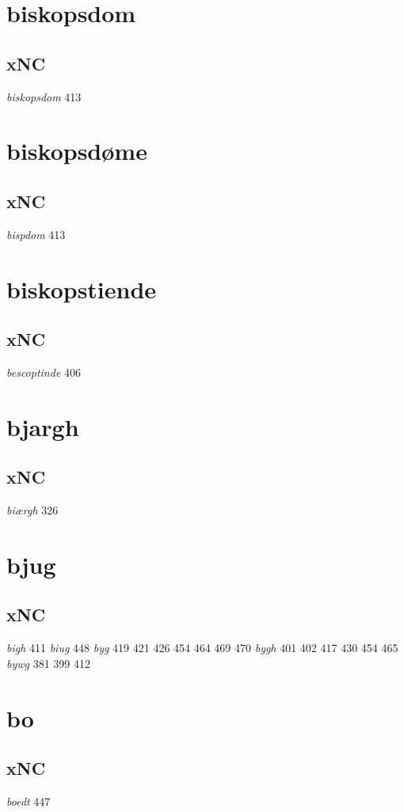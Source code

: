 \documentclass[a4paper,twocolumn]{article}
\begin{document}
\section{biskopsdom}
\label{sec:org0793478}
\subsection{xNC}
\label{sec:orgd5d79ae}
\emph{biskopsdom} 413 
\section{biskopsdøme}
\label{sec:org14a1450}
\subsection{xNC}
\label{sec:org1ad78c2}
\emph{bispdom} 413 
\section{biskopstiende}
\label{sec:orgf503265}
\subsection{xNC}
\label{sec:orgd4f937e}
\emph{bescoptinde} 406 
\section{bjargh}
\label{sec:orga0af52b}
\subsection{xNC}
\label{sec:org2cc499a}
\emph{biærgh} 326 
\section{bjug}
\label{sec:org2ef1be2}
\subsection{xNC}
\label{sec:orga3f7c33}
\emph{bigh} 411 \emph{biug} 448 \emph{byg} 419 421 426 454 464 469 470 \emph{bygh} 401 402 417 430 454 465 \emph{bywg} 381 399 412 
\section{bo}
\label{sec:org1a81cb1}
\subsection{xNC}
\label{sec:orge790dbf}
\emph{boedt} 447 
\end{document}
